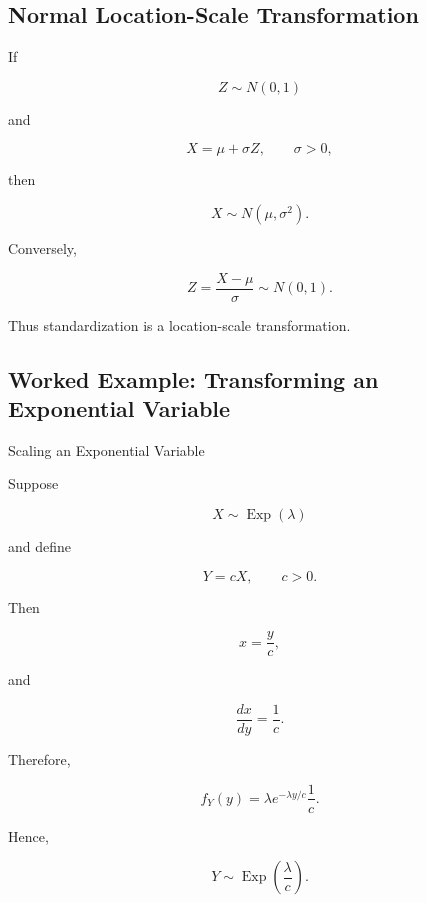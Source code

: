 \subsection{Normal Location-Scale Transformation}
\label{subsec:normal-location-scale-transform}

If

\[
Z\sim N(0,1)
\]

and

\[
X=\mu+\sigma Z,
\qquad
\sigma>0,
\]

then

\[
\boxed{
X\sim N(\mu,\sigma^2).
}
\]

Conversely,

\[
\boxed{
Z
=
\frac{X-\mu}{\sigma}
\sim
N(0,1).
}
\]

Thus standardization is a location-scale transformation.

\subsection{Worked Example: Transforming an Exponential Variable}
\label{subsec:worked-scaled-exponential}

\begin{workedexamplebox}{Scaling an Exponential Variable}

Suppose

\[
X\sim\operatorname{Exp}(\lambda)
\]

and define

\[
Y=cX,
\qquad
c>0.
\]

Then

\[
x=\frac{y}{c},
\]

and

\[
\frac{dx}{dy}
=
\frac1c.
\]

Therefore,

\[
f_Y(y)
=
\lambda
e^{-\lambda y/c}
\frac1c.
\]

Hence,

\begin{answerbox}
\[
\boxed{
Y
\sim
\operatorname{Exp}
\left(
\frac{\lambda}{c}
\right).
}
\]
\end{answerbox}

\end{workedexamplebox}

